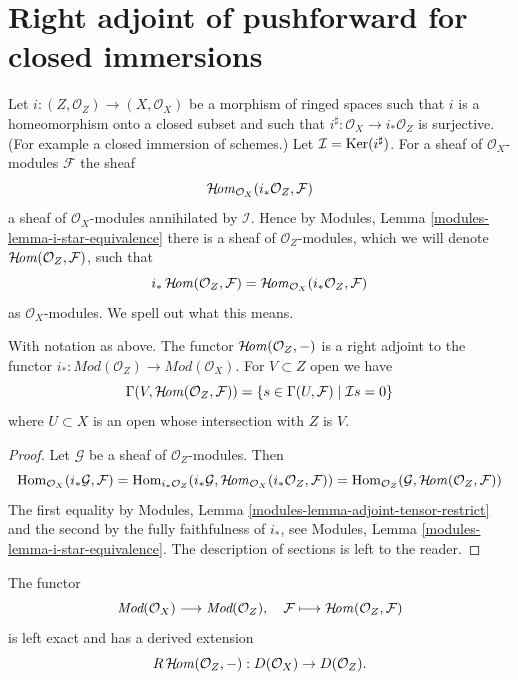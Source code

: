 \section{Right adjoint of pushforward for closed immersions}
\label{section-sections-with-exact-support}

\noindent
Let $i : (Z, \mathcal{O}_Z) \to (X, \mathcal{O}_X)$ be a morphism
of ringed spaces such that $i$ is a homeomorphism onto a closed
subset and such that $i^\sharp : \mathcal{O}_X \to i_*\mathcal{O}_Z$
is surjective. (For example a closed immersion of schemes.)
Let $\mathcal{I} = \mathop{\mathrm{Ker}}(i^\sharp)$. For a sheaf
of $\mathcal{O}_X$-modules $\mathcal{F}$ the sheaf
$$
\mathop{\mathcal{H}\!\mathit{om}}\nolimits_{\mathcal{O}_X}(i_*\mathcal{O}_Z, \mathcal{F})
$$
a sheaf of $\mathcal{O}_X$-modules annihilated by $\mathcal{I}$.
Hence by Modules, Lemma \ref{modules-lemma-i-star-equivalence}
there is a sheaf of $\mathcal{O}_Z$-modules,
which we will denote $\mathop{\mathcal{H}\!\mathit{om}}\nolimits(\mathcal{O}_Z, \mathcal{F})$,
such that
$$
i_*\mathop{\mathcal{H}\!\mathit{om}}\nolimits(\mathcal{O}_Z, \mathcal{F}) =
\mathop{\mathcal{H}\!\mathit{om}}\nolimits_{\mathcal{O}_X}(i_*\mathcal{O}_Z, \mathcal{F})
$$
as $\mathcal{O}_X$-modules. We spell out what this means.

\begin{lemma}
\label{lemma-compute-sheaf-with-exact-support}
With notation as above. The functor $\mathop{\mathcal{H}\!\mathit{om}}\nolimits(\mathcal{O}_Z, -)$ is a
right adjoint to the functor
$i_* : \textit{Mod}(\mathcal{O}_Z) \to \textit{Mod}(\mathcal{O}_X)$.
For $V \subset Z$ open we have
$$
\Gamma(V, \mathop{\mathcal{H}\!\mathit{om}}\nolimits(\mathcal{O}_Z, \mathcal{F})) =
\{s \in \Gamma(U, \mathcal{F}) \mid \mathcal{I}s = 0\}
$$
where $U \subset X$ is an open whose intersection with $Z$ is $V$.
\end{lemma}

\begin{proof}
Let $\mathcal{G}$ be a sheaf of $\mathcal{O}_Z$-modules. Then
$$
\mathop{\mathrm{Hom}}\nolimits_{\mathcal{O}_X}(i_*\mathcal{G}, \mathcal{F}) =
\mathop{\mathrm{Hom}}\nolimits_{i_*\mathcal{O}_Z}(i_*\mathcal{G},
\mathop{\mathcal{H}\!\mathit{om}}\nolimits_{\mathcal{O}_X}(i_*\mathcal{O}_Z, \mathcal{F})) =
\mathop{\mathrm{Hom}}\nolimits_{\mathcal{O}_Z}(\mathcal{G}, \mathop{\mathcal{H}\!\mathit{om}}\nolimits(\mathcal{O}_Z, \mathcal{F}))
$$
The first equality by
Modules, Lemma \ref{modules-lemma-adjoint-tensor-restrict}
and the second by the fully faithfulness of $i_*$, see
Modules, Lemma \ref{modules-lemma-i-star-equivalence}.
The description of sections is left to the reader.
\end{proof}

\noindent
The functor
$$
\textit{Mod}(\mathcal{O}_X)
\longrightarrow
\textit{Mod}(\mathcal{O}_Z),
\quad
\mathcal{F} \longmapsto \mathop{\mathcal{H}\!\mathit{om}}\nolimits(\mathcal{O}_Z, \mathcal{F})
$$
is left exact and has a derived extension
$$
R\mathop{\mathcal{H}\!\mathit{om}}\nolimits(\mathcal{O}_Z, -) : D(\mathcal{O}_X) \to D(\mathcal{O}_Z).
$$

